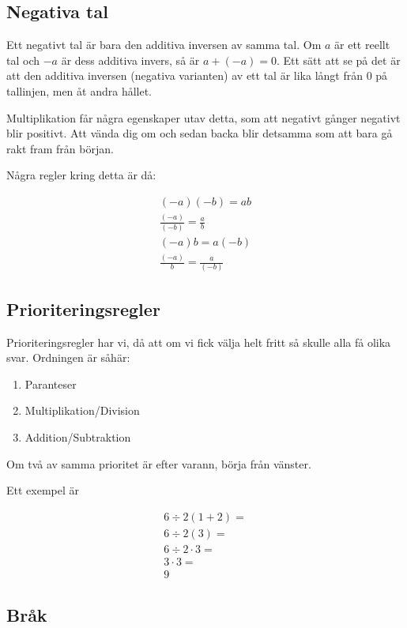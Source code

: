 \subsection{Negativa tal}

Ett negativt tal är bara den additiva inversen av samma tal. Om $a$ är ett reellt tal och $-a$ är dess additiva invers, så är $a+(-a)=0$. Ett sätt att se på det är att den additiva inversen (negativa varianten) av ett tal är lika långt från $0$ på tallinjen, men åt andra hållet. 

Multiplikation får några egenskaper utav detta, som att negativt gånger negativt blir positivt. Att vända dig om och sedan backa blir detsamma som att bara gå rakt fram från början.

Några regler kring detta är då:

\begin{align}
	(-a)(-b) = ab \\
	\frac{(-a)}{(-b)} = \frac{a}{b} \\
	(-a)b = a(-b) \\
	\frac{(-a)}{b} = \frac{a}{(-b)}
\end{align}

\newpage
\subsection{Prioriteringsregler}

Prioriteringsregler har vi, då att om vi fick välja helt fritt så skulle alla få olika svar. Ordningen är såhär:

\begin{enumerate}
	\item Paranteser
	\item Multiplikation/Division 	
	\item Addition/Subtraktion
\end{enumerate}

Om två av samma prioritet är efter varann, börja från vänster.

Ett exempel är 

\begin{align*}
	6\div 2(1+2) = \\
	6\div 2(3) = \\
	6\div 2 \cdot 3 = \\
	3 \cdot 3 = \\
	9
\end{align*}

\newpage
\subsection{Bråk}

